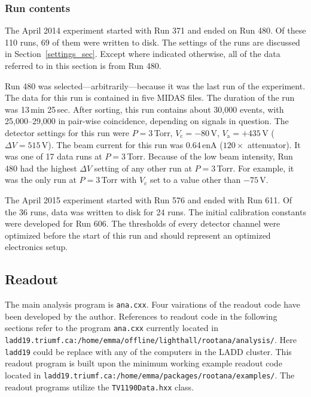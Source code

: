 \subsubsection{Run contents}

The April 2014 experiment started with Run 371 and ended on Run 480.  Of these 110 runs, 69 of them were written to disk. 
The settings of the runs are discussed in Section~\ref{settings_sec}.  
Except where indicated otherwise, all of the data referred to in this section is from Run 480.

Run 480 was selected---arbitrarily---because it was the last run of the experiment. The data for this run is contained in five MIDAS files. The duration of the run was 13\,min 25\,sec. After sorting, this run contains about 30,000 events, with 25,000--29,000 in pair-wise coincidence, depending on signals in question. The detector settings for this run were $P=3$\,Torr, $V_\textrm{c}=-80$\,V, $V_\textrm{a}=+435$\,V ($\Delta V=515$\,V).  The beam current for this run was 0.64\,enA ($120\times$ attenuator). It was one of 17 data runs at $P=3$\,Torr. Because of the low beam intensity, Run 480 had the highest $\Delta V$ setting of any other run at $P=3$\,Torr.  For example, it was the only run at $P=3$\,Torr with $V_\textrm{c}$ set to a value other than $-75$\,V.

The April 2015 experiment started with Run 576 and ended with Run 611. Of the 36 runs, data was written to disk for 24 runs. The initial calibration constants were developed for Run 606. The thresholds of every detector channel were optimized before the start of this run and should represent an optimized electronics setup.

\subsection{Readout}
\vsetlinux
The main analysis program is \texttt{ana.cxx}. Four vairations of the readout code have been developed by the author.
References to readout code in the following sections refer to the program \texttt{ana.cxx} currently located in 
\verb|ladd19.triumf.ca:/home/emma/offline/lighthall/rootana/analysis/|.  Here \texttt{ladd19} 
could be replace with any of the computers in the LADD cluster.  This readout program is built upon the minimum working example readout code located in \verb|ladd19.triumf.ca:/home/emma/packages/rootana/examples/|. The readout programs utilize the \texttt{TV1190Data.hxx} class.

